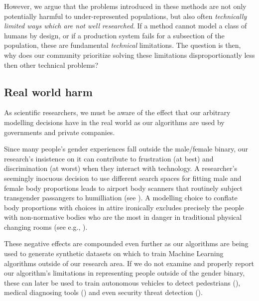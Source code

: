 \documentclass[sigconf,review,balance=false]{acmart}
\begin{document}
However, we argue that the problems introduced in these methods are not only potentially harmful to under-represented populations, but also often \emph{technically limited ways which are not well researched}. If a method cannot model a class of humans by design, or if a production system fails for a subsection of the population, these are fundamental \emph{technical} limitations. The question is then, why does our community prioritize solving these limitations disproportionatly less then other technical problems?

\subsection{Real world harm}


As scientific researchers, we must be aware of the effect that our arbitrary
modelling decisions have in the real world as our algorithms are used by
governments and private companies.

Since many people's gender experiences fall outside the male/female binary, our
research's insistence on it can contribute to frustration (at best) and
discrimination (at worst) when they interact with technology. A researcher's
seemingly inocuous decision to use different search spaces for fitting male and
female body proportions leads to airport body scanners that routinely subject
transgender passangers to humilliation (see \cite{tsa}). A modelling choice to
conflate body proportions with choices in attire ironically excludes precisely
the people with non-normative bodies who are the most in danger in traditional
physical changing rooms (see e.g., \cite{changingroom}). 


These negative effects are compounded even further as our algorithms are being
used to generate synthetic datasets on which to train Machine Learning
algorithms outside of our research area. If we do not examine and properly
report our algorithm's limitations in representing people outside of the gender
binary, these can later be used to train autonomous vehicles to detect
pedestrians (\cite{cars}), medical diagnosing tools (\cite{chen2021synthetic})
and even security threat detection (\cite{dhs}).
\end{document}
